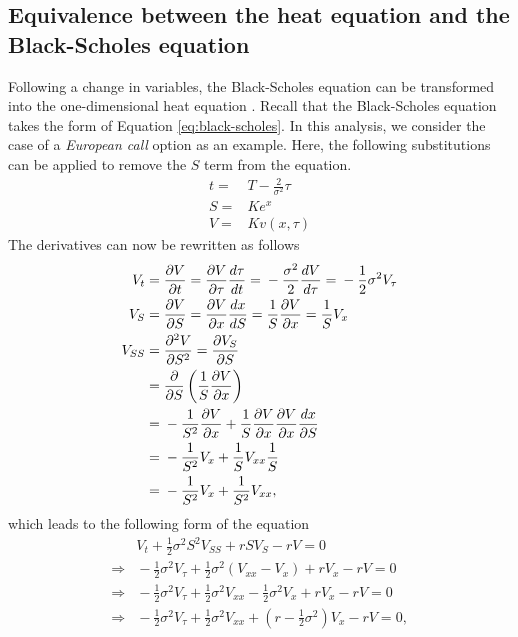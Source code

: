 \subsection{Equivalence between the heat equation and the Black-Scholes equation}\label{sec:equivalence} 
Following a change in variables, the Black-Scholes equation can be transformed into the one-dimensional heat equation \cite{wilmott_1995_mathematics}. Recall that the Black-Scholes equation takes the form of Equation \eqref{eq:black-scholes}.
In this analysis, we consider the case of a \textit{European call} option as an example. Here, the following substitutions can be applied to remove the $S$ term from the equation.
\begin{align} 
t ={}& T - \frac{2}{\sigma^2} \tau  \label{eq:t-substituion} \\ 
S ={}& Ke^x                         \label{eq:s-substition}  \\
V ={}& Kv(x,\tau)                   \label{eq:v-substitution}
\end{align} 
The derivatives can now be rewritten as follows
\begin{align}
    V_t 
{}={}& 
    \frac{\partial V}{\partial t} 
    {}={} 
    \frac{\partial V}{\partial \tau} \frac{d \tau}{dt} 
    {}={} 
    -\frac{\sigma^2}{2} \frac{dV}{d\tau} 
    {}={}  -\frac{1}{2} \sigma^2 V_{\tau}
\\
    V_S
{}={}& 
    \frac{\partial V}{\partial S} 
    {}={} 
    \frac{\partial V}{\partial x} \frac{dx}{dS} 
    {}={} 
    \frac{1}{S} \frac{\partial V}{\partial x} 
    {}={}
    \frac{1}{S} V_x
\\
    V_{SS} 
{}={}& 
    \frac{\partial^2 V}{\partial S^2} 
    {}={} 
    \frac{\partial V_S}{\partial S} 
\notag\\
{}={}& 
    \frac{\partial}{\partial S} \left( \frac{1}{S} \frac{\partial V}{\partial x} \right) 
\notag\\
{}={}& 
    -\frac{1}{S^2} \frac{\partial V}{\partial x} + \frac{1}{S} \frac{\partial V}{\partial x} \frac{\partial V}{\partial x} \frac{dx}{\partial S} 
\notag\\
{}={}& 
    -\frac{1}{S^2} V_x + \frac{1}{S} V_{xx} \frac{1}{S} 
\notag\\
{}={}& 
    -\frac{1}{S^2} V_x + \frac{1}{S^2} V_{xx},
\end{align}
which leads to the following form of the equation
\begin{equation}
\begin{aligned}
& V_t + \frac{1}{2}\sigma^2 S^2 V_{SS} + rSV_S - rV =  0
\\
\Rightarrow{}&{}  -\frac{1}{2}\sigma^2 V_{\tau} + \frac{1}{2} \sigma^2 (V_{xx} - V_x) + rV_x - rV = 0
\\
\Rightarrow{}&{} -\frac{1}{2}\sigma^2 V_{\tau} + \frac{1}{2} \sigma^2 V_{xx} -\frac{1}{2}\sigma^2 V_x + rV_x - rV = 0
\\
\Rightarrow{}&{} -\frac{1}{2}\sigma^2 V_{\tau} + \frac{1}{2} \sigma^2 V_{xx} + (r - \frac{1}{2}\sigma^2)V_x - rV = 0,
\end{aligned}
\end{equation}

